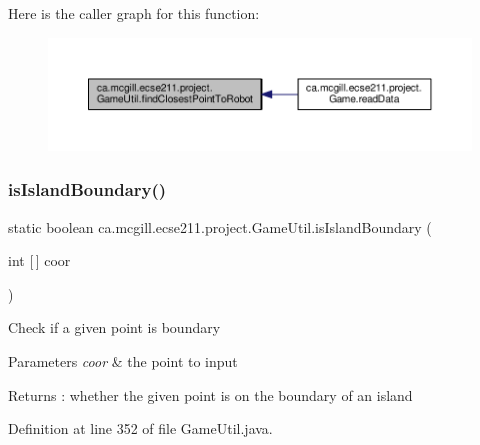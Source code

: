 Here is the caller graph for this function\+:\nopagebreak
\begin{figure}[H]
\begin{center}
\leavevmode
\includegraphics[width=350pt]{classca_1_1mcgill_1_1ecse211_1_1project_1_1_game_util_a6e0ee94b800ca3727ca8009782abda14_icgraph}
\end{center}
\end{figure}
\mbox{\label{classca_1_1mcgill_1_1ecse211_1_1project_1_1_game_util_a5783c3415e13b66362a647504b63741a}} 
\subsubsection{\texorpdfstring{is\+Island\+Boundary()}{isIslandBoundary()}}
{\footnotesize\ttfamily static boolean ca.\+mcgill.\+ecse211.\+project.\+Game\+Util.\+is\+Island\+Boundary (\begin{DoxyParamCaption}\item[{int \mbox{[}$\,$\mbox{]}}]{coor }\end{DoxyParamCaption})\hspace{0.3cm}{\ttfamily [static]}}

Check if a given point is boundary


\begin{DoxyParams}{Parameters}
{\em coor} & the point to input \\
\hline
\end{DoxyParams}
\begin{DoxyReturn}{Returns}
\+: whether the given point is on the boundary of an island 
\end{DoxyReturn}


Definition at line 352 of file Game\+Util.\+java.


